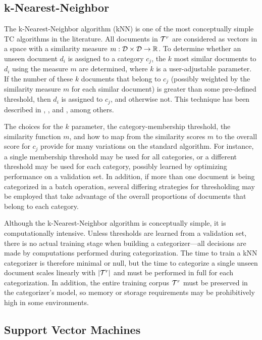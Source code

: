 \subsection{k-Nearest-Neighbor}
\label{knn}

The k-Nearest-Neighbor algorithm (kNN) is one of the most conceptually
simple TC algorithms in the literature.  All documents in $\mathcal{T}^r$ are
considered as vectors in a space with a similarity measure $m: \mathcal{D}
\times \mathcal{D} \to \mathbb{R}$.  To determine whether an unseen document
$d_i$ is assigned to a category $c_j$, the $k$ most similar documents
to $d_i$ using the measure $m$ are determined, where $k$ is a
user-adjustable parameter.  If the number of these $k$ documents that
belong to $c_j$ (possibly weighted by the similarity measure $m$ for
each similar document) is greater than some pre-defined threshold,
then $d_i$ is assigned to $c_j$, and otherwise not.  This technique
has been described in \cite[p. 28]{sebastiani:02}, \cite{yang:99}, and
\cite{yang:97}, among others.

The choices for the $k$ parameter, the category-membership threshold,
the similarity function $m$, and how to map from the similarity scores
$m$ to the overall score for $c_j$ provide for many variations on the
standard algorithm.  For instance, a single membership threshold may
be used for all categories, or a different threshold may be used for
each category, possibly learned by optimizing performance on a
validation set.  In addition, if more than one document is being
categorized in a batch operation, several differing strategies for
thresholding may be employed that take advantage of the overall
proportions of documents that belong to each category. \cite{yang:01}

Although the k-Nearest-Neighbor algorithm is conceptually simple, it
is computationally intensive.  Unless thresholds are learned from a
validation set, there is no actual training stage when building a
categorizer---all decisions are made by computations performed during
categorization.  The time to train a kNN categorizer is therefore
minimal or null, but the time to categorize a single unseen document
scales linearly with $|\mathcal{T}^r|$ and must be performed in full for each
categorization.  In addition, the entire training corpus $\mathcal{T}^r$ must
be preserved in the categorizer's model, so memory or storage
requirements may be prohibitively high in some environments.

\subsection{Support Vector Machines}

